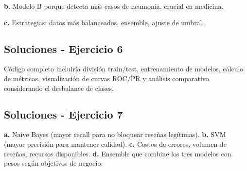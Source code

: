 \documentclass[12pt]{article}
\begin{document}
\textbf{b.} Modelo B porque detecta más casos de neumonía, crucial en medicina.

\textbf{c.} Estrategias: datos más balanceados, ensemble, ajuste de umbral.

\subsection{Soluciones - Ejercicio 6}

Código completo incluiría división train/test, entrenamiento de modelos, cálculo de métricas, visualización de curvas ROC/PR y análisis comparativo considerando el desbalance de clases.

\subsection{Soluciones - Ejercicio 7}

\textbf{a.} Naive Bayes (mayor recall para no bloquear reseñas legítimas).
\textbf{b.} SVM (mayor precisión para mantener calidad).
\textbf{c.} Costos de errores, volumen de reseñas, recursos disponibles.
\textbf{d.} Ensemble que combine los tres modelos con pesos según objetivos de negocio.
\end{document}
